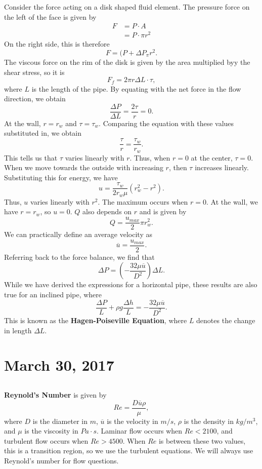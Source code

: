 \documentclass[11pt]{article}
\theoremstyle{plain} %
\theoremstyle{definition}
\theoremstyle{example}
\theoremstyle{remark}
\begin{document}
Consider the force acting on a disk shaped fluid element. The pressure force on the left of the face is given by 
\begin{align*}
	F &= P\cdot A\\
	&= P \cdot \pi r^2
\end{align*}
On the right side, this is therefore 
$$F = (P + \Delta P_\pi r^2.$$
The viscous force on the rim of the disk is given by the area multiplied byy the shear stress, so it is 
$$F_f = 2\pi r \Delta L \cdot \tau,$$
where $L$ is the length of the pipe. By equating with the net force in the flow direction, we obtain 
$$\frac{\Delta P}{\Delta L} = \frac{2 \tau}{r} = 0.$$
At the wall, $r = r_w$ and $\tau = \tau_w$. Comparing the equation with these values substituted in, we obtain 
$$\frac{\tau}{r} = \frac{\tau_w}{r_w}.$$
This tells us that $\tau$ varies linearly with $r$. Thus, when $r=0$ at the center, $\tau=0$. When we move towards the outside with increasing $r$, then $\tau$ increases linearly. Substituting this for energy, we have 
$$u = \frac{\tau_w}{2r_w \mu}\left(r_w^2-r^2\right).$$
Thus, $u$ varies linearly with $r^2$. The maximum occurs when $r=0$. At the wall, we have $r=r_w$, so $u = 0$. 
$Q$ also depends on $r$ and is given by 
$$Q = \frac{u_{max}}{2}\pi r_w^2.$$
We can practically define an average velocity as 
$$\overline u = \frac{u_{max}}{2}.$$
Referring back to the force balance, we find that 
$$\Delta P = \left(-\frac{32 \mu \overline u}{D^2}\right)\Delta L.$$
While we have derived the expressions for a horizontal pipe, these results are also true for an inclined pipe, where 
$$\frac{\Delta P}{L} + \rho g\frac{\Delta h}{L} = -\frac{32 \mu \overline u}{D^2}.$$
This is known as the \textbf{Hagen-Poiseville Equation}, where $L$ denotes the change in length $\Delta L$. 
	
	
\section{March 30, 2017}
\subsection{}

\textbf{Reynold's Number} is given by 
$$Re = \frac{D\overline u\rho}{\mu},$$
where $D$ is the diameter in $m$, $\overline u$ is the velocity in $m/s$, $\rho$ is the density in $kg/m^3$, and $\mu$ is the viscosity in $Pa\cdot s$. Laminar flow occurs when $Re <2100$, and turbulent flow occurs when $Re>4500$. When $Re$ is between these two values, this is a transition region, so we use the turbulent equations. We will always use Reynold's number for flow questions. 	
\end{document}
